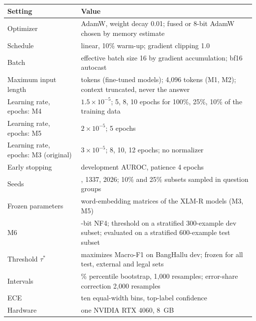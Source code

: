 \begin{tabular}{@{}>{\raggedright}p{3.6cm}>{\raggedright\arraybackslash}p{9.4cm}@{}}
\toprule
Setting & Value \tabularnewline
\midrule
Optimizer & AdamW, weight decay 0.01; fused or 8-bit AdamW chosen by memory estimate \tabularnewline
Schedule & linear, 10\% warm-up; gradient clipping 1.0 \tabularnewline
Batch & effective batch size 16 by gradient accumulation; bf16 autocast \tabularnewline
Maximum input length & 512 tokens (fine-tuned models); 4,096 tokens (M1, M2); context truncated, never the answer \tabularnewline
Learning rate, epochs: M4 & $1.5\times10^{-5}$; 5, 8, 10 epochs for 100\%, 25\%, 10\% of the training data \tabularnewline
Learning rate, epochs: M5 & $2\times10^{-5}$; 5 epochs \tabularnewline
Learning rate, epochs: M3 (original) & $3\times10^{-5}$; 8, 10, 12 epochs; no normalizer \tabularnewline
Early stopping & development AUROC, patience 4 epochs \tabularnewline
Seeds & 42, 1337, 2026; 10\% and 25\% subsets sampled in question groups \tabularnewline
Frozen parameters & word-embedding matrices of the XLM-R models (M3, M5) \tabularnewline
M6 & 4-bit NF4; threshold on a stratified 300-example dev subset; evaluated on a stratified 600-example test subset \tabularnewline
Threshold $\tau^*$ & maximizes Macro-F1 on BangHallu dev; frozen for all test, external and legal sets \tabularnewline
Intervals & 95\% percentile bootstrap, 1,000 resamples; error-share correction 2,000 resamples \tabularnewline
ECE & ten equal-width bins, top-label confidence \tabularnewline
Hardware & one NVIDIA RTX 4060, 8~GB \tabularnewline
\bottomrule
\end{tabular}
